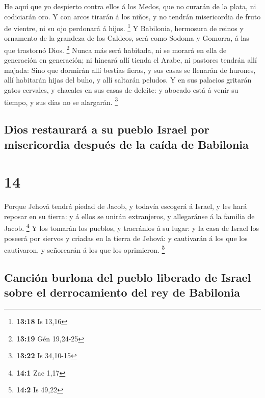  He aquí que yo despierto contra ellos á los Medos, que
no curarán de la plata, ni codiciarán oro.  Y con arcos
tirarán á los niños, y no tendrán misericordia de fruto de vientre, ni
su ojo perdonará á hijos. \footnote{\textbf{13:18} Is 13,16}
 Y Babilonia, hermosura de reinos y ornamento de la
grandeza de los Caldeos, será como Sodoma y Gomorra, á las que trastornó
Dios. \footnote{\textbf{13:19} Gén 19,24-25}  Nunca más
será habitada, ni se morará en ella de generación en generación; ni
hincará allí tienda el Arabe, ni pastores tendrán allí majada:
 Sino que dormirán allí bestias fieras, y sus casas se
llenarán de hurones, allí habitarán hijas del buho, y allí saltarán
peludos.  Y en sus palacios gritarán gatos cervales, y
chacales en sus casas de deleite: y abocado está á venir su tiempo, y
sus días no se alargarán. \footnote{\textbf{13:22} Is 34,10-15}

\hypertarget{dios-restauraruxe1-a-su-pueblo-israel-por-misericordia-despuuxe9s-de-la-cauxedda-de-babilonia}{%
\subsection{Dios restaurará a su pueblo Israel por misericordia después
de la caída de
Babilonia}\label{dios-restauraruxe1-a-su-pueblo-israel-por-misericordia-despuuxe9s-de-la-cauxedda-de-babilonia}}

\hypertarget{section-13}{%
\section{14}\label{section-13}}

 Porque Jehová tendrá piedad de Jacob, y todavía escogerá
á Israel, y les hará reposar en su tierra: y á ellos se unirán
extranjeros, y allegaránse á la familia de Jacob. \footnote{\textbf{14:1}
  Zac 1,17}  Y los tomarán los pueblos, y traeránlos á su
lugar: y la casa de Israel los poseerá por siervos y criadas en la
tierra de Jehová: y cautivarán á los que los cautivaron, y señorearán á
los que los oprimieron. \footnote{\textbf{14:2} Is 49,22}

\hypertarget{canciuxf3n-burlona-del-pueblo-liberado-de-israel-sobre-el-derrocamiento-del-rey-de-babilonia}{%
\subsection{Canción burlona del pueblo liberado de Israel sobre el
derrocamiento del rey de
Babilonia}\label{canciuxf3n-burlona-del-pueblo-liberado-de-israel-sobre-el-derrocamiento-del-rey-de-babilonia}}

